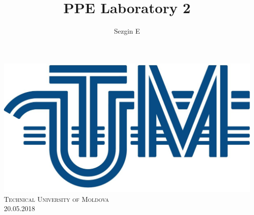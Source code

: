 \documentclass[12pt]{article}
\title{PPE Laboratory 2}
\author{Sezgin E}
\begin{document}
        
        
        \begin{titlepage}
                \centering
                \vspace*{0.5 cm}
                \includegraphics[scale = 0.11]{LOGO_UTM.jpg}\\[1.0 cm]	%
                \textsc{\LARGE Technical University of Moldova}\\[2.0 cm]%
                \textsc{\Large 20.05.2018}\\[0.5 cm]		%


\end{titlepage}
\end{document}
